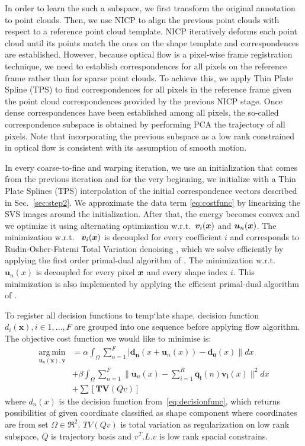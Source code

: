In order to learn the such a subspace, we first transform the original annotation to point clouds. Then, we use NICP to align the previous point clouds with respect to a reference point cloud template. NICP iteratively deforms each point cloud until its points match the ones on the shape template and correspondences are established. However, because optical flow is a pixel-wise frame registration technique, we need to establish correspondences for all pixels on the reference frame rather than for sparse point clouds. To achieve this, we apply Thin Plate Spline (TPS) \cite{Bookstein1989} to find correspondences for all pixels in the reference frame given the point cloud correspondences provided by the previous NICP stage. Once dense correspondences have been established among all pixels, the so-called correspondence subspace is obtained by performing PCA the trajectory of all pixels. Note that incorporating the previous subspace as a low rank constrained in optical flow is consistent with its assumption of smooth motion.

In every coarse-to-fine and warping iteration, we use an initialization that comes from the previous iteration and for the very beginning, we initialize with a Thin Plate Splines (TPS) \cite{Bookstein1989} interpolation of the initial correspondence vectors described in Sec.~\ref{sec:step2}. We approximate the data term \eqref{eq:costfunc} by linearizing the SVS images around the initialization. After that, the energy becomes convex and we optimize it using alternating optimization w.r.t.~$\bm{v}_i(\boldsymbol{x})$ and $\bm{u}_n(\boldsymbol{x})$. The minimization w.r.t.~
$\bm{v}_i(\boldsymbol{x})$ is decoupled for every coefficient $i$ and corresponds to Rudin-Osher-Fatemi Total Variation denoising \cite{rudin92}, which we solve efficiently by applying the first order primal-dual algorithm of \cite{Chambolle:Pock:JMIV2011}. The minimization w.r.t.~
$\bm{u}_n(x)$ is decoupled for every pixel $\boldsymbol{x}$ and every shape index $i$. This minimization is also implemented by applying the efficient primal-dual algorithm of \cite{Chambolle:Pock:JMIV2011}.

To register all decision functions to temp`late shape, decision function $d_i(\bm{x}), i \in {1,...,F}$ are grouped into one sequence before applying flow algorithm. The objective cost function we would like to minimise is:
\begin{align}
    \operatorname*{arg\,min}_{\bm{u}_n(\bm{x}), \bm{v}}&=\alpha \int_{\Omega}\sum_{n=1}^F|\bm{d_n}(x+\bm{u}_n(x))-\bm{d_0}(x)\| dx  \label{eq:costfunc}\\
    &+ \beta \int_{\Omega}\sum_{n=1}^F\|\bm{u}_n(x)-\sum_{i=1}^R\bm{q_i}(n)\bm{v_i}(x)\|^2 dx \label{eq:lowrank}\\
    &+ \sum[\bm{TV}(Qv)]
\end{align}
where $d_n(x)$ is the decision function from~\eqref{eq:decisionfunc}, which returns possibilities of given coordinate classified as shape component where coordinates are from set $\Omega \in \Re^2$. $TV(Qv)$ is total variation as regularization on low rank subspace, $Q$ is trajectory basis and $v^T.L.v$ is low rank spacial constrains.

